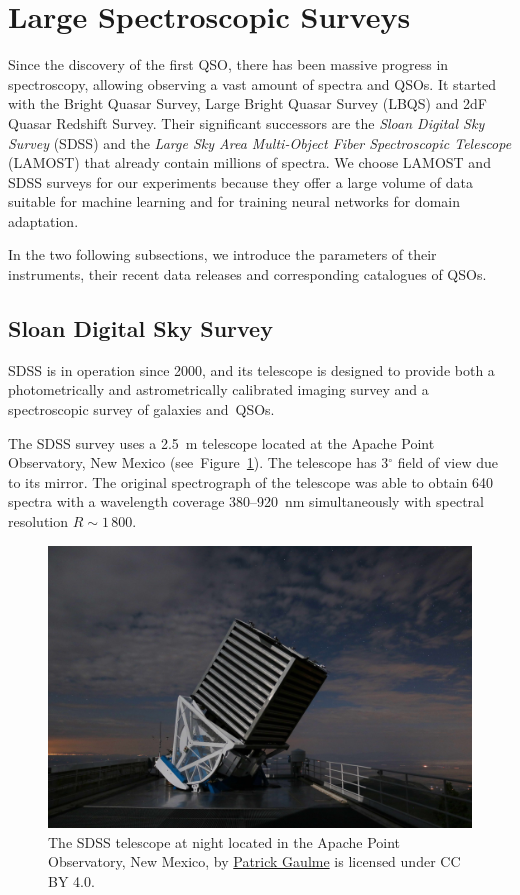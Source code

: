 \section{Large Spectroscopic Surveys}
\label{large_spec_surveys}

Since the discovery of the first QSO,
there has been massive progress in spectroscopy,
allowing observing a vast amount of spectra and QSOs.
It started with the Bright Quasar Survey, Large Bright Quasar Survey (LBQS) and 2dF Quasar Redshift Survey.
Their significant successors are the \textit{Sloan Digital Sky Survey} (SDSS)
and the \textit{Large Sky Area Multi-Object Fiber Spectroscopic Telescope} (LAMOST)
that already contain millions of spectra.
We choose LAMOST and SDSS surveys for our experiments
because they offer a large volume of data suitable for machine learning
and for training neural networks for domain adaptation.

In the two following subsections,
we introduce the parameters of their instruments,
their recent data releases and corresponding catalogues of QSOs.

\subsection{Sloan Digital Sky Survey}
\label{sdss}

SDSS is in operation since 2000,
and its telescope is designed to provide both a photometrically
and astrometrically calibrated imaging survey
and a spectroscopic survey of galaxies and~QSOs.~\cite{york2000}

The SDSS survey uses a 2.5~m telescope located at the Apache Point Observatory, New Mexico (see~Figure~\ref{sdss_telescope}).
The telescope has 3\(^{\circ}\) field of view due to its mirror.
The original spectrograph of the telescope was able to obtain 640 spectra
with a wavelength coverage 380--920~nm simultaneously
with spectral resolution \(R \sim 1\,800\).~\cite{york2000, gunn1998}

\begin{figure}
\includegraphics[width=\textwidth]{img/sdss_gaulme.jpg}
\caption[The SDSS telescope at night]{
	The SDSS telescope at night located in the Apache Point Observatory, New Mexico, by \href{https://www.sdss.org/wp-content/uploads/2016/07/sdss_gaulme1.jpg}{Patrick Gaulme} is licensed under CC BY 4.0.
	}
\label{sdss_telescope}
\end{figure}

